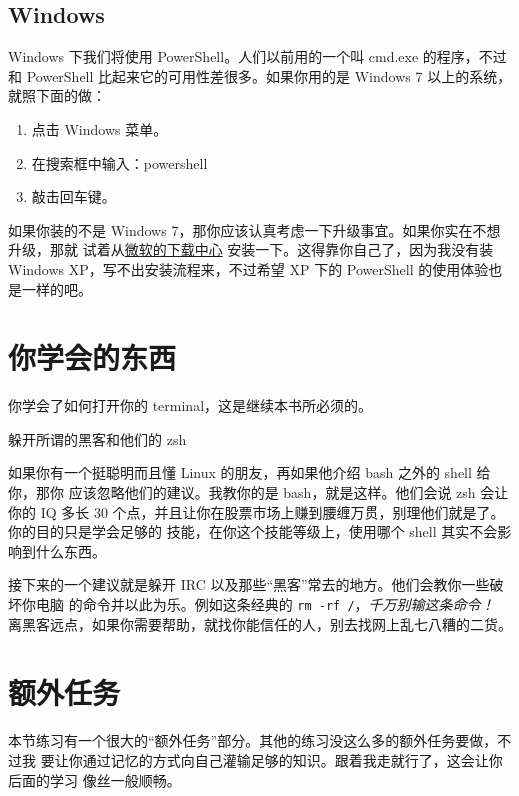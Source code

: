 \subsection{Windows}

Windows 下我们将使用 PowerShell。人们以前用的一个叫 cmd.exe 的程序，不过和 PowerShell
比起来它的可用性差很多。如果你用的是 Windows 7 以上的系统，就照下面的做：

\begin{enumerate}
\item 点击 Windows 菜单。
\item 在搜索框中输入：powershell
\item 敲击回车键。
\end{enumerate}

如果你装的不是 Windows 7，那你应该认真考虑一下升级事宜。如果你实在不想升级，那就
试着从\href{http://www.microsoft.com/download/en/details.aspx?displaylang=en&id=16818}{微软的下载中心}
安装一下。这得靠你自己了，因为我没有装 Windows XP，写不出安装流程来，不过希望 XP
下的 PowerShell 的使用体验也是一样的吧。

\section{你学会的东西}

你学会了如何打开你的 terminal，这是继续本书所必须的。

\begin{aside}{躲开所谓的黑客和他们的 zsh}

如果你有一个挺聪明而且懂 Linux 的朋友，再如果他介绍 bash 之外的 shell 给你，那你
应该忽略他们的建议。我教你的是 bash，就是这样。他们会说 zsh 会让你的 IQ 多长 30
个点，并且让你在股票市场上赚到腰缠万贯，别理他们就是了。你的目的只是学会足够的
技能，在你这个技能等级上，使用哪个 shell 其实不会影响到什么东西。

接下来的一个建议就是躲开 IRC 以及那些“黑客”常去的地方。他们会教你一些破坏你电脑
的命令并以此为乐。例如这条经典的 \verb|rm -rf /|，\emph{千万别输这条命令！}
离黑客远点，如果你需要帮助，就找你能信任的人，别去找网上乱七八糟的二货。
\end{aside}

\section{额外任务}

本节练习有一个很大的“额外任务”部分。其他的练习没这么多的额外任务要做，不过我
要让你通过记忆的方式向自己灌输足够的知识。跟着我走就行了，这会让你后面的学习
像丝一般顺畅。

